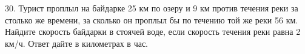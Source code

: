 30. Турист проплыл на байдарке 25 км по озеру и 9 км против течения реки за столько же времени, за сколько он проплыл бы по течению той же реки 56 км. Найдите скорость байдарки в стоячей воде, если скорость течения реки равна 2 км/ч. Ответ дайте в километрах в час.\\
